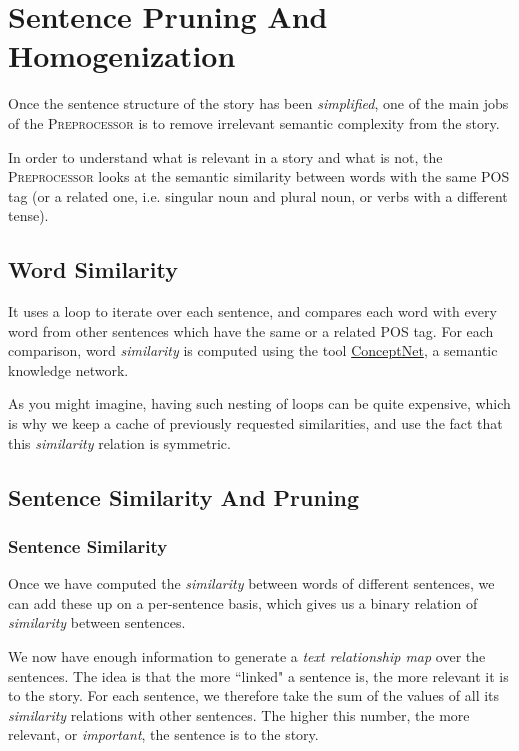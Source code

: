\section{Sentence Pruning And Homogenization}
\label{sec:pruning_homogenization}

Once the sentence structure of the story has been \textit{simplified}, one of the main jobs of the \textsc{Preprocessor} is to remove irrelevant semantic complexity from the story.

In order to understand what is relevant in a story and what is not, the \textsc{Preprocessor} looks at the semantic similarity between words with the same POS tag (or a related one, i.e. singular noun and plural noun, or verbs with a different tense).

\subsection{Word Similarity}

It uses a loop to iterate over each sentence, and compares each word with every word from other sentences which have the same or a related POS tag. For each comparison, word \textit{similarity} is computed using the tool \href{http://www.conceptnet.io}{ConceptNet}, a semantic knowledge network.

As you might imagine, having such nesting of loops can be quite expensive, which is why we keep a cache of previously requested similarities, and use the fact that this \textit{similarity} relation is symmetric.

\subsection{Sentence Similarity And Pruning}

\subsubsection{Sentence Similarity}

Once we have computed the \textit{similarity} between words of different sentences, we can add these up on a per-sentence basis, which gives us a binary relation of \textit{similarity} between sentences.

We now have enough information to generate a \textit{text relationship map} over the sentences. The idea is that the more ``linked" a sentence is, the more relevant it is to the story. For each sentence, we therefore take the sum of the values of all its \textit{similarity} relations with other sentences. The higher this number, the more relevant, or \textit{important}, the sentence is to the story.

